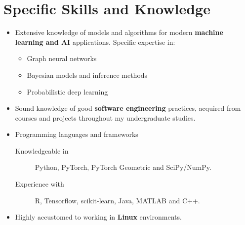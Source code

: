 \documentclass[12pt]{article}
\makeatletter
\newcommand{\email}{joel.oskarsson@liu.se}
\makeatother
\begin{document}
\section*{Specific Skills and Knowledge}
\begin{itemize}
    \item Extensive knowledge of models and algorithms for modern \textbf{machine learning and AI} applications. Specific expertise in:
    \begin{itemize}
        \item Graph neural networks
        \item Bayesian models and inference methods
        \item Probabilistic deep learning
    \end{itemize}

\item Sound knowledge of good \textbf{software engineering} practices, acquired from courses and projects throughout my undergraduate studies.

    \item Programming languages and frameworks
    \begin{description}
        \item [Knowledgeable in] Python, PyTorch, PyTorch Geometric and SciPy/NumPy.
        \item [Experience with] R, Tensorflow, scikit-learn, Java, MATLAB and C++.
    \end{description}

\item Highly accustomed to working in \textbf{Linux} environments.
\end{itemize}

\end{document}
